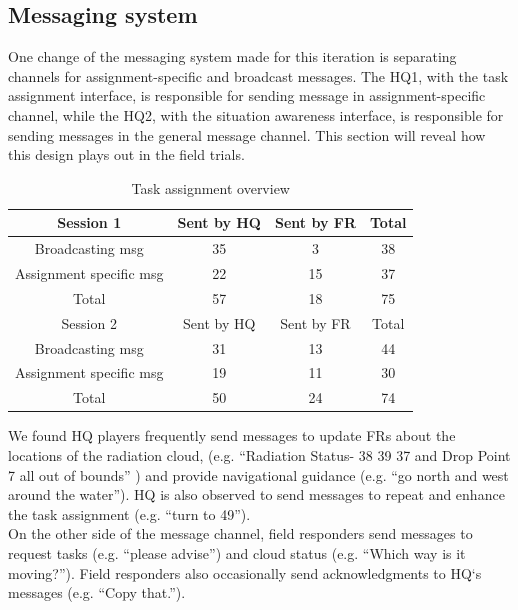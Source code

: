 \subsection{Messaging system}
One change of the messaging system made for this iteration is separating channels for assignment-specific and broadcast messages. The HQ1, with the task assignment interface, is responsible for sending message in assignment-specific channel, while the HQ2, with the situation awareness interface, is responsible for sending messages in the general message channel. This section will reveal how this design plays out in the field trials. \\


\begin{table}[h]
\centering
\footnotesize
\begin{tabular}{c|ccc}
Session 1               & Sent by HQ & Sent by FR & Total \\ \hline
Broadcasting msg        & 35         & 3          & 38    \\
Assignment specific msg & 22         & 15         & 37    \\
Total                   & 57         & 18         & 75    \\
Session 2               & Sent by HQ & Sent by FR & Total \\ \hline
Broadcasting msg        & 31         & 13         & 44    \\
Assignment specific msg & 19         & 11         & 30    \\
Total                   & 50         & 24         & 74   
\end{tabular}
\caption{Task assignment overview}
\label{tab:ResultsOverview}
\end{table}

We found HQ  players frequently send messages to update FRs about the locations of the radiation cloud, (e.g. ``Radiation Status- 38  39  37 and Drop Point 7 all out of bounds'' ) and provide navigational guidance (e.g. ``go north  and west around the water''). HQ is also observed to send messages to repeat and enhance the task assignment (e.g. ``turn to 49'').\\

On the other side of the message channel, field responders send messages to request tasks (e.g. ``please advise'') and cloud status (e.g. ``Which way is it moving?''). Field responders also occasionally send acknowledgments to HQ`s messages (e.g. ``Copy that.''). \\

